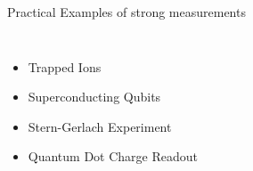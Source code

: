 \documentclass[
]{beamer}
\begin{document}
\begin{frame}{Practical Examples of strong measurements}
	\begin{columns}
		\begin{itemize}
			\item<1-> Trapped Ions
			\item<2-> Superconducting Qubits
			\item<3-> Stern-Gerlach Experiment
			\item<4-> Quantum Dot Charge Readout
		\end{itemize}


\end{columns}
\end{frame}
\end{document}
